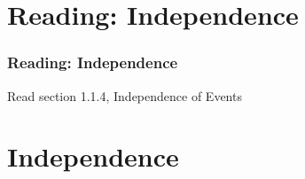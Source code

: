 \documentclass[12pt, block=fill]{beamer}
\begin{document}
%
%
%
%
%



\section{Reading: Independence}

\begin{frame}
  \frametitle{Reading: Independence}
  Read section 1.1.4, Independence of Events
\end{frame}


\section{Independence}
\end{document}
